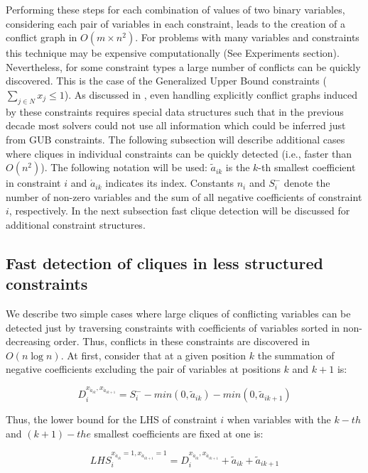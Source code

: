 \documentclass{endm}
\begin{document}
Performing these steps for each combination of values of two binary variables, considering each pair of variables in each constraint, leads to the creation of a conflict graph in $O(m \times n^2)$. For problems with many variables and constraints this technique may be expensive computationally (See Experiments section). Nevertheless, for some constraint types a large number of conflicts can be quickly discovered. This is the case of the Generalized Upper Bound constraints ($\sum_{j\in N}x_j \leq 1$). As discussed in \cite{atamturk}, even handling explicitly conflict graphs induced by these constraints requires special data structures such that in the previous decade most solvers could not use all information which could be inferred just from GUB constraints. The following subsection will describe additional cases where cliques in individual constraints can be quickly detected (i.e., faster than $O(n^2)$). The following notation will be used: $\tilde{a}_{ik}$ is the $k$-th smallest coefficient in constraint $i$ and $\acute{a}_{ik}$ indicates its index. Constants $n_i$ and $S_i^-$ denote the number of non-zero variables and the sum of all negative coefficients of constraint $i$, respectively. In the next subsection fast clique detection will be discussed for additional constraint structures.


\subsection{Fast detection of cliques in less structured constraints}

We describe two simple cases where large cliques of conflicting variables can be detected just by traversing constraints with  coefficients of variables sorted in non-decreasing order. Thus, conflicts in these constraints are discovered in $O( n \log n)$. At first, consider that at a given position $k$ the summation of negative coefficients excluding the pair of variables at positions $k$ and $k+1$ is: 

\begin{equation}\label{di}
D_{i}^{x_{\acute{a}_{ik}}, x_{\acute{a}_{ik+1}}} = S_i^- - min(0, \tilde{a}_{ik}) - min(0, \tilde{a}_{ik+1})
\end{equation}

\noindent Thus, the lower bound for the LHS of constraint $i$ when variables with the $k-th$ and $(k+1)-the$ smallest coefficients are fixed at one is:

\begin{equation}
LHS_{i}^{x_{\acute{a}_{ik}} = 1, x_{\acute{a}_{ik+1}} = 1} = D_{i}^{x_{\acute{a}_{ik}}, x_{\acute{a}_{ik+1}}} + \tilde{a}_{ik} + \tilde{a}_{ik+1}
\end{equation}
\end{document}

